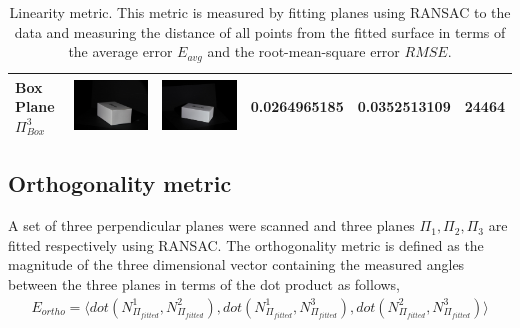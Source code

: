 \documentclass[final,12pt,3p]{elsarticle}
\begin{document}
\begin{table}[!ht]
{\begin{tabular}{| l | >{\centering\arraybackslash} m{2.5cm} | >{\centering\arraybackslash} m{2.5cm} | c | c | c |}
   Box Plane $\Pi_{Box}^{3}$ & \includegraphics[scale=0.05]{./box_cam1.JPG} & \includegraphics[scale=0.05]{./box_cam2.JPG} & 0.0264965185	& 0.0352513109 & 24464\\
   \hline  
\end{tabular}
}
  \caption{\label{tab:metric1} Linearity metric. This metric is measured by fitting planes using RANSAC to the data and measuring the distance of all points from the fitted surface in terms of the average error $E_{avg}$ and the root-mean-square error $RMSE$.}
  \end{table}

\subsection{Orthogonality metric}
A set of three perpendicular planes were scanned and three planes $\Pi_{1}, \Pi_{2}, \Pi_{3}$ are fitted respectively using RANSAC. The orthogonality metric is defined as the magnitude of the three dimensional vector containing the measured angles between the three planes in terms of the dot product as follows,
\begin{multline}
	E_{ortho} = \langle dot(N_{\Pi_{fitted}}^1, N_{\Pi_{fitted}}^2), dot(N_{\Pi_{fitted}}^1, N_{\Pi_{fitted}}^3), dot(N_{\Pi_{fitted}}^2, N_{\Pi_{fitted}}^3) \rangle
\end{multline}
\end{document}
